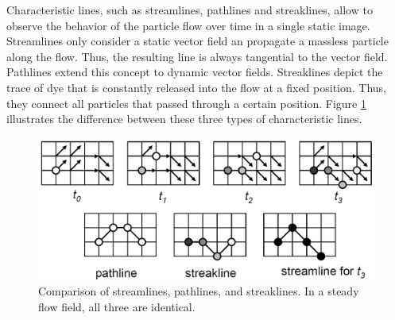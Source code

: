Characteristic lines, such as streamlines, pathlines and streaklines, allow to observe the behavior of the particle flow over time in a single static image.
Streamlines only consider a static vector field an propagate a massless particle along the flow.
Thus, the resulting line is always tangential to the vector field.
Pathlines extend this concept to dynamic vector fields.
Streaklines depict the trace of dye that is constantly released into the flow at a fixed position.
Thus, they connect all particles that passed through a certain position.
Figure \ref{fig:background:characteristic-lines} illustrates the difference between these three types of characteristic lines.
\begin{figure}[ht]
	\centering
	\includegraphics[width=0.75\linewidth]{figures/background/characteristic-lines.png}
	\caption{
		Comparison of streamlines, pathlines, and streaklines. 
		In a steady flow field, all three are identical.
	}
	\label{fig:background:characteristic-lines}
\end{figure}

